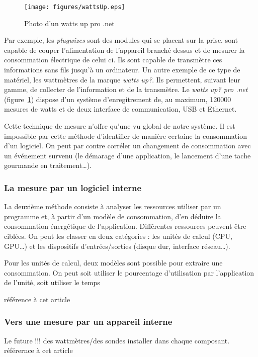 \documentclass[a4paper, 11pt]{report}
\begin{document}
\begin{figure}
		\texttt{[image: figures/wattsUp.eps]}
		\caption{Photo d'un watts up pro .net}
		\label{wattsUp}
\end{figure}

Par exemple, les \textit{plugwizes} sont des modules qui se placent sur la prise. sont capable de couper l'alimentation de l'appareil branché dessus et de mesurer la consommation électrique de celui ci. Ils sont capable de transmètre ces informations sans fils jusqu'à un ordinateur. Un autre exemple de ce type de matériel, les wattmètres de la marque \textit{watts up\/?}. Ils permettent, suivant leur gamme, de collecter de l'information et de la transmètre. Le \textit{watts up\/? pro .net} (figure~\ref{wattsUp}) dispose d'un système d'enregitrement de, au maximum, 120000 mesures de watts et de deux interface de communication, USB et Ethernet.

Cette technique de mesure n'offre qu'une vu global de notre système. Il est impossible par cette méthode d'identifier de manière certaine la consommation d'un logiciel. On peut par contre corréler un changement de consommation avec un événement survenu (le démarage d'une application, le lancement d'une tache gourmande en traitement\ldots). 

			\subsubsection{La mesure par un logiciel interne}
La deuxième méthode consiste à analyser les ressources utiliser par un programme et, à partir d'un modèle de consommation, d'en déduire la consommation énergétique de l'application. Différentes ressources peuvent être ciblées. On peut les classer en deux catégories : les unités de calcul (CPU, GPU\ldots) et les dispositifs d'entrées/sorties (disque dur, interface réseau\ldots).

Pour les unités de calcul, deux modèles sont possible pour extraire une consommation. On peut soit utiliser le pourcentage d'utilisation par l'application de l'unité, soit utiliser le temps 

référence à cet article \cite{noureddine:hal-00681560}

			\subsubsection{Vers une mesure par un appareil interne}
Le future !!! des wattmètres/des sondes installer dans chaque composant. référernce à cet article\cite{Esmaeilzadeh:2011:LBL:1950365.1950402}
		
\end{document}
